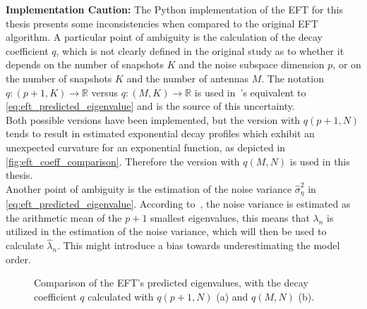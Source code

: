 \textbf{Implementation Caution:}
The Python implementation of the EFT for this thesis presents some inconsistencies when compared to the original EFT
algorithm. A particular point of ambiguity is the calculation of the decay coefficient \( q \), which is not clearly
defined in the original study as to whether it depends on the number of snapshots \( K \) and the noise subspace
dimension \( p \), or on the number of snapshots \( K \) and the number of antennas \( M \).
The notation \( q : (p + 1, K) \rightarrow \mathbb{R} \) versus \( q : (M, K) \rightarrow \mathbb{R} \) is used in~\cite{eft}'s
equivalent to \autoref{eq:eft_predicted_eigenvalue} and is the source of this uncertainty.\\
Both possible versions have
been implemented, but the version with \( q(p+1, N) \) tends to result in estimated exponential decay profiles which
exhibit an unexpected curvature for an exponential function, as depicted in \autoref{fig:eft_coeff_comparison}.
Therefore the version with \( q(M, N) \) is used in this thesis.\\
Another point of ambiguity is the estimation of the noise variance \( \widehat{\sigma}^2_{\eta} \) in \autoref{eq:eft_predicted_eigenvalue}.
According to~\cite{eft}, the noise variance is estimated as the arithmetic mean of the \( p + 1 \) smallest eigenvalues,
this means that \( \lambda_n \) is utilized in the estimation of the noise variance, which will then be used to calculate
\( \hat{\lambda}_n \). This might introduce a bias towards underestimating the model order.

\begin{figure}[H]
    \centering
    \caption{Comparison of the EFT's predicted eigenvalues, with the decay coefficient \( q \) calculated with \( q(p+1, N) \) (a) and \( q(M, N) \) (b).}
    \label{fig:eft_coeff_comparison}
\end{figure}

